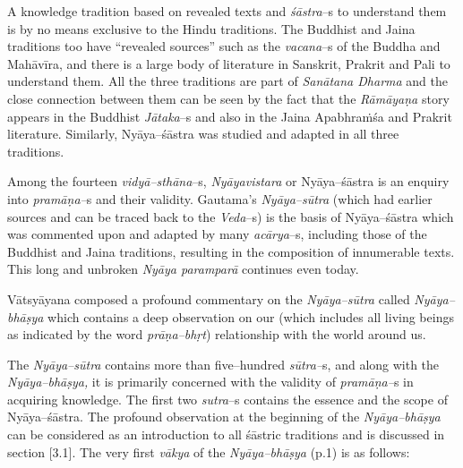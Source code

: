 A knowledge tradition based on revealed texts and \textit{śāstra}–s to understand them is by no means exclusive to the Hindu traditions. The Buddhist and Jaina traditions too have “revealed sources” such as the \textit{vacana}–s of the Buddha and Mahāvīra, and there is a large body of literature in Sanskrit, Prakrit and Pali to understand them. All the three traditions are part of \textit{Sanātana Dharma} and the close connection between them can be seen by the fact that the \textit{Rāmāyaṇa} story appears in the Buddhist \textit{Jātaka}–s and also in the Jaina Apabhraṁśa and Prakrit literature. Similarly, Nyāya–śāstra was studied and adapted in all three traditions.

Among the fourteen \textit{vidyā–sthāna}–s, \textit{Nyāyavistara} or Nyāya–śāstra is an enquiry into \textit{pramāṇa–}s and their validity. Gautama’s \textit{Nyāya–sūtra} (which had earlier sources and can be traced back to the \textit{Veda}–s) is the basis of Nyāya–śāstra which was commented upon and adapted by many \textit{acārya}–s, including those of the Buddhist and Jaina traditions, resulting in the composition of innumerable texts. This long and unbroken \textit{Nyāya paramparā} continues even today.

Vātsyāyana composed a profound commentary on the \textit{Nyāya–sūtra} called \textit{Nyāya–bhāṣya} which contains a deep observation on our (which includes all living beings as indicated by the word \textit{prāṇa–bhṛt}) relationship with the world around us.

\newpage

The \textit{Nyāya–sūtra} contains more than five–hundred \textit{sūtra–}s, and along with the \textit{Nyāya–bhāṣya,} it is primarily concerned with the validity of \textit{pramāṇa–}s in acquiring knowledge. The first two \textit{sutra}–s contains the essence and the scope of Nyāya–śāstra. The profound observation at the beginning of the \textit{Nyāya–bhāṣya} can be considered as an introduction to all śāstric traditions and is discussed in section [3.1]. The very first \textit{vākya} of the \textit{Nyāya–bhāṣya} (p.1) is as follows:

